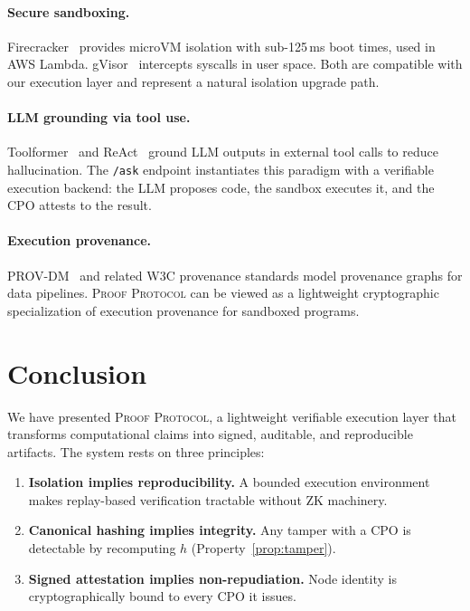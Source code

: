 \documentclass[11pt]{article}
\begin{document}
\paragraph{Secure sandboxing.}
Firecracker~\citep{firecracker} provides microVM isolation with
sub-125\,ms boot times, used in AWS Lambda.  gVisor~\citep{gvisor}
intercepts syscalls in user space.  Both are compatible with our execution
layer and represent a natural isolation upgrade path.

\paragraph{LLM grounding via tool use.}
Toolformer~\citep{toolformer} and ReAct~\citep{react} ground LLM outputs
in external tool calls to reduce hallucination.  The \texttt{/ask}
endpoint instantiates this paradigm with a verifiable execution backend:
the LLM proposes code, the sandbox executes it, and the CPO attests to the
result.

\paragraph{Execution provenance.}
PROV-DM~\citep{provdm} and related W3C provenance standards model
provenance graphs for data pipelines.  \textsc{Proof Protocol} can be
viewed as a lightweight cryptographic specialization of execution provenance
for sandboxed programs.

\section{Conclusion}
\label{sec:conclusion}

We have presented \textsc{Proof Protocol}, a lightweight verifiable
execution layer that transforms computational claims into signed, auditable,
and reproducible artifacts.  The system rests on three principles:

\begin{enumerate}
  \item \textbf{Isolation implies reproducibility.}  A bounded execution
        environment makes replay-based verification tractable without ZK
        machinery.
  \item \textbf{Canonical hashing implies integrity.}  Any tamper with a
        CPO is detectable by recomputing $h$ (Property~\ref{prop:tamper}).
  \item \textbf{Signed attestation implies non-repudiation.}  Node identity
        is cryptographically bound to every CPO it issues.
\end{enumerate}
\end{document}
